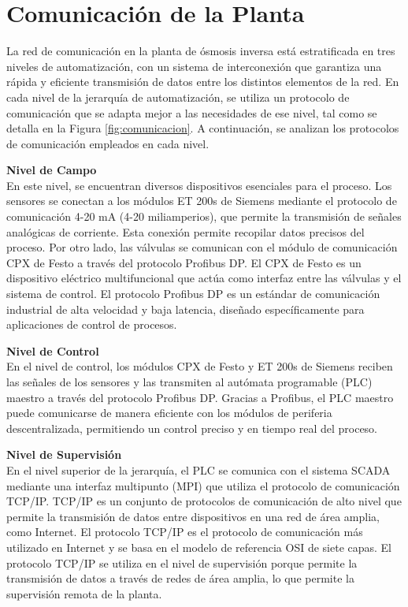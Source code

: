 \section{Comunicación de la Planta}

La red de comunicación en la planta de ósmosis inversa está
estratificada en tres niveles de automatización, con un sistema
de interconexión que garantiza una rápida y eficiente transmisión
de datos entre los distintos elementos de la red. En cada nivel
de la jerarquía de automatización, se utiliza un protocolo de
comunicación que se adapta mejor a las necesidades
de ese nivel, tal como se detalla en la Figura \ref{fig:comunicacion}.
A continuación, se analizan los protocolos de comunicación empleados
en cada nivel.

\textbf{Nivel de Campo}\\
En este nivel, se encuentran
diversos dispositivos esenciales para el proceso. Los sensores se conectan a
los módulos ET 200s de Siemens mediante el protocolo de comunicación 4-20 mA
(4-20 miliamperios), que permite la transmisión de señales analógicas de corriente.
Esta conexión permite recopilar datos precisos del proceso. Por otro lado,
las válvulas se comunican con el módulo de comunicación CPX de Festo a través
del protocolo Profibus DP. El CPX de Festo es un dispositivo eléctrico multifuncional
que actúa como interfaz entre las válvulas y el sistema de control.
El protocolo Profibus DP es un estándar de comunicación industrial de alta
velocidad y baja latencia, diseñado específicamente para aplicaciones de control
de procesos. 

\textbf{Nivel de Control}\\
En el nivel de control, los módulos CPX de Festo y ET 200s de
Siemens reciben las señales de los sensores y las transmiten al
autómata programable (PLC) maestro a través del protocolo Profibus DP. Gracias a Profibus, el PLC maestro puede comunicarse de manera
eficiente con los módulos de periferia descentralizada,
permitiendo un control preciso y en tiempo real del proceso. 


\textbf{Nivel de Supervisión}\\
En el nivel superior de la jerarquía, el PLC se comunica con el sistema SCADA 
mediante una interfaz multipunto (MPI) que utiliza el protocolo de comunicación TCP/IP.
 TCP/IP es un conjunto de protocolos de comunicación de alto nivel que permite la 
 transmisión de datos entre dispositivos en una red de área amplia, como Internet.
  El protocolo TCP/IP es el protocolo de comunicación más utilizado en Internet y 
  se basa en el modelo de referencia OSI de siete capas. El protocolo TCP/IP se 
  utiliza en el nivel de supervisión porque permite la transmisión de datos a 
  través de redes de área amplia, lo que permite la supervisión remota de la planta.

